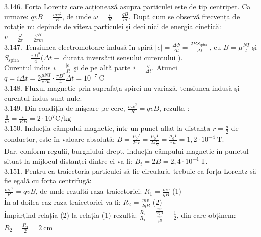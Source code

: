 3.146. Forța Lorentz care acționează asupra particulei este de tip centripet. Ca urmare: $q v B=\frac{m v^{2}}{R}$, de unde $\omega=\frac{v}{R}=\frac{q B}{m}$. Dupã cum se observă frecvența de rotație nu depinde de viteza particulei şi deci nici de energia cinetică:\\ $v=\frac{\omega}{2 \pi}=\frac{q B}{2 \pi m}$\\

3.147. Tensiunea electromotoare indusă în spiră $|e|=\frac{\Delta \Phi}{\Delta t}=\frac{2 B S_{\text {spira }}}{\Delta t}$, cu $B=\mu \frac{N I}{l}$ şi $S_{\text {spira }}=\frac{\pi D^{2}}{4}(\Delta t-$ durata inversării sensului curentului $)$.\\ Curentul indus $i=\frac{|e|}{R}$ şi de pe altă parte $i=\frac{q}{\Delta t}$. Atunci\\ $q=i \Delta t=2 \frac{\mu N I}{e \Delta t} \cdot \frac{\pi D^{2}}{4} \Delta t=10^{-7} \mathrm{~C}$\\

3.148. Fluxul magnetic prin suprafaţa spirei nu variază, tensiunea indusă şi curentul indus sunt nule.\\

3.149. Din condiția de mişcare pe cerc, $\frac{m v^{2}}{R}=q v B$, rezultă :\\ $\frac{q}{m}=\frac{v}{R B}=2 \cdot 10^{7} \mathrm{C} / \mathrm{kg}$\\

3.150. Inducția câmpului magnetic, într-un punct aflat la distanța $r=\frac{a}{2}$ de conductor, este în valoare absolută: $B=\frac{\mu_{0} I}{2 \pi r}=\frac{\mu_{0} I}{2 \pi \frac{a}{2}}=\frac{\mu_{0} I}{\pi a}=1,2 \cdot 10^{-4} \mathrm{~T}$.\\ Dar, conform regulii, burghiului drept, inducția câmpului magnetic în punctul situat la mijlocul distanței dintre ei va fi: $B_{t}=2 B=2,4 \cdot 10^{-4} \mathrm{~T}$.\\

3.151. Pentru ca traiectoria particulei să fie circulară, trebuie ca forța Lorentz să fie egală cu forța centrifugă:\\ $\frac{m v^{2}}{R}=q v B$, de unde rezultă raza traiectoriei: $R_{1}=\frac{m v}{q B}$ (1)\\ În al doilea caz raza traiectoriei va fi: $R_{2}=\frac{m v}{2 q B}$ (2)\\ Împărțind relația (2) la relația (1) rezultă: $\frac{R_{2}}{R_{1}}=\frac{\frac{m v}{2 q B}}{\frac{m v}{q B}}=\frac{1}{2}$, din care obținem:\\ $R_{2}=\frac{R_{1}}{2}=2 \mathrm{~cm}$\\

